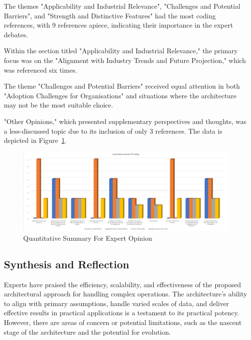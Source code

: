 \documentclass[review]{elsarticle}
\begin{document}
The themes "Applicability and Industrial Relevance", "Challenges and Potential Barriers", and "Strength and Distinctive Features" had the most coding references, with 9 references apiece, indicating their importance in the expert debates.

Within the section titled "Applicability and Industrial Relevance," the primary focus was on the "Alignment with Industry Trends and Future Projection," which was referenced six times.

The theme "Challenges and Potential Barriers" received equal attention in both "Adoption Challenges for Organisations" and situations where the architecture may not be the most suitable choice.

"Other Opinions," which presented supplementary perspectives and thoughts, was a less-discussed topic due to its inclusion of only 3 references. The data is depicted in Figure~\ref{fig:quantitativeSummaryForExpertOpinion}.

\begin{figure}[ht]

  \centering

  \includegraphics[width=\textwidth]{images/Quantitative-Summary-For-Codes.png}

  \caption{Quantitative Summary For Expert Opinion}

  \label{fig:quantitativeSummaryForExpertOpinion}

\end{figure}

\subsection{Synthesis and Reflection} \label{expertOpinion_synthesisReflection}

Experts have praised the efficiency, scalability, and effectiveness of the proposed architectural approach for handling complex operations. The architecture's ability to align with primary assumptions, handle varied scales of data, and deliver effective results in practical applications is a testament to its practical potency. However, there are areas of concern or potential limitations, such as the nascent stage of the architecture and the potential for evolution.
\end{document}

